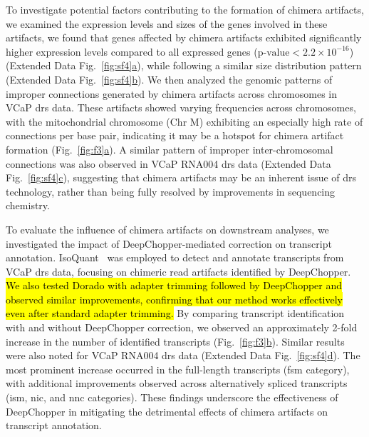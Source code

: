 \documentclass[pdflatex,sn-nature, lineno]{sn-jnl}%
\newcommand{\figref}[2]{Fig.~\hyperref[#1]{\ref*{#1}#2}}
\newcommand{\edfigref}[2]{Extended Data Fig.~\hyperref[#1]{\ref*{#1}#2}}
\begin{document}
To investigate potential factors contributing to the formation of chimera artifacts, we examined the expression levels and sizes of the genes involved in these artifacts, we found that genes affected by chimera artifacts exhibited significantly higher expression levels compared to all expressed genes (\(\textrm{p-value} < 2.2 \times 10^{-16}\)) (\edfigref{fig:sf4}{a}), while following a similar size distribution pattern (\edfigref{fig:sf4}{b}).
We then analyzed the genomic patterns of improper connections generated by chimera artifacts across chromosomes in VCaP \gls{drs} data.
These artifacts showed varying frequencies across chromosomes, with the mitochondrial chromosome (Chr M) exhibiting an especially high rate of connections per base pair, indicating it may be a hotspot for chimera artifact formation (\figref{fig:f3}{a}).
A similar pattern of improper inter-chromosomal connections was also observed in VCaP RNA004 \gls{drs} data (\edfigref{fig:sf4}{c}), suggesting that chimera artifacts may be an inherent issue of \gls{drs} technology, rather than being fully resolved by improvements in sequencing chemistry.

To evaluate the influence of chimera artifacts on downstream analyses, we investigated the impact of DeepChopper-mediated correction on transcript annotation.
IsoQuant~\cite{prjibelski2023accurate} was employed to detect and annotate transcripts from VCaP \gls{drs} data, focusing on chimeric read artifacts identified by DeepChopper.
\hl{We also tested Dorado with adapter trimming followed by DeepChopper and observed similar improvements, confirming that our method works effectively even after standard adapter trimming.}
By comparing transcript identification with and without DeepChopper correction, we observed an approximately 2-fold increase in the number of identified transcripts (\figref{fig:f3}{b}).
Similar results were also noted for VCaP RNA004 \gls{drs} data (\edfigref{fig:sf4}{d}).
The most prominent increase occurred in the full-length transcripts (\gls{fsm} category), with additional improvements observed across alternatively spliced transcripts (\gls{ism}, \gls{nic}, and \gls{nnc} categories).
These findings underscore the effectiveness of DeepChopper in mitigating the detrimental effects of chimera artifacts on transcript annotation.
\end{document}
